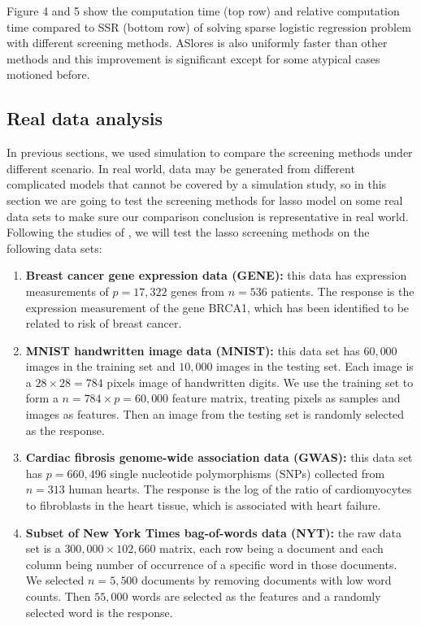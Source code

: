 Figure 4 and 5 show the computation time (top row) and relative computation time compared to SSR (bottom row) of solving sparse logistic regression problem with different screening methods. ASlores is also uniformly faster than other methods and this improvement is significant except for some atypical cases motioned before.


\subsection{Real data analysis}
\label{sec:real-data}

In previous sections, we used simulation to compare the screening methods under different scenario. In real world, data may be generated from different complicated models that cannot be covered by a simulation study, so in this section we are going to test the screening methods for lasso model on some real data sets to make sure our comparison conclusion is representative in real world. Following the studies of \citep{wang2013lasso, xiang2016screening, Zeng2021}, we will test the lasso screening methods on the following data sets:

\begin{enumerate}
    \item \textbf{Breast cancer gene expression data
(GENE):} this data has expression measurements of $p=17,322$ genes from $n=536$ patients. The response is the expression measurement of the gene BRCA1, which has been identified to be related to risk of breast cancer.
    \item \textbf{MNIST handwritten image data
(MNIST):} this data set has $60,000$ images in the training set and $10,000$ images in the testing set. Each image is a $28\times 28=784$ pixels image of handwritten digits. We use the training set to form a $n=784\times p=60,000$ feature matrix, treating pixels as samples and images as features. Then an image from the testing set is randomly selected as the response.
    \item \textbf{ Cardiac fibrosis genome-wide association data
(GWAS):} this data set has $p=660,496$ single nucleotide
polymorphisms (SNPs) collected from $n=313$ human hearts. The response is the log of the ratio of cardiomyocytes to fibroblasts in the heart tissue, which is associated with heart failure.
    \item \textbf{Subset of New York Times bag-of-words data
(NYT):} the raw data set is a $300,000\times 102,660$ matrix, each row being a document and each column being number of occurrence of a specific word in those documents. We selected $n=5,500$ documents by removing documents with low word counts. Then $55,000$ words are selected as the features and a randomly selected word is the response.

\end{enumerate}


